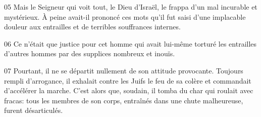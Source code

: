 
05 Mais le Seigneur qui voit tout, le Dieu d’Israël, le frappa d’un mal incurable et mystérieux. À peine avait-il prononcé ces mots qu’il fut saisi d’une implacable douleur aux entrailles et de terribles souffrances internes.

06 Ce n’était que justice pour cet homme qui avait lui-même torturé les entrailles d’autres hommes par des supplices nombreux et inouïs.

07 Pourtant, il ne se départit nullement de son attitude provocante. Toujours rempli d’arrogance, il exhalait contre les Juifs le feu de sa colère et commandait d’accélérer la marche. C’est alors que, soudain, il tomba du char qui roulait avec fracas: tous les membres de son corps, entraînés dans une chute malheureuse, furent désarticulés.
